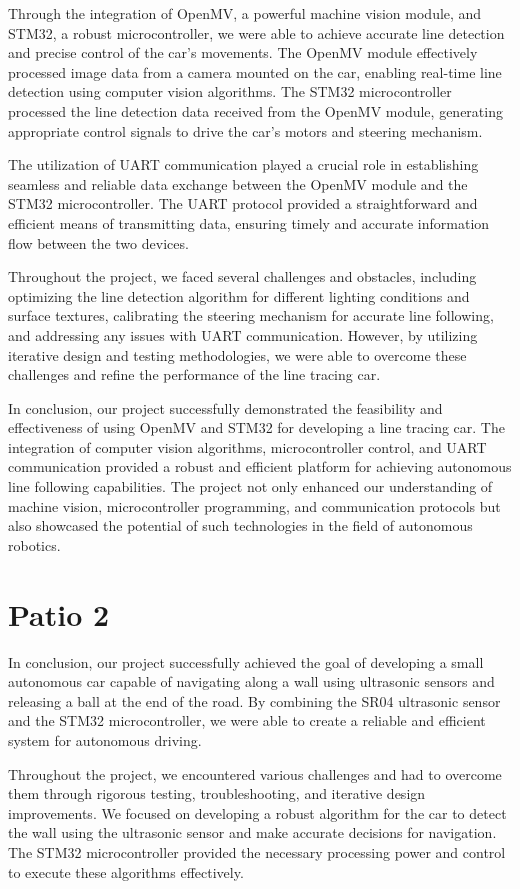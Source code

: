 \documentclass[12pt, a4paper, oneside]{report}
\begin{document}
Through the integration of OpenMV, a powerful machine vision module, and STM32, a robust microcontroller, we were able to achieve accurate line detection and precise control of the car's movements. The OpenMV module effectively processed image data from a camera mounted on the car, enabling real-time line detection using computer vision algorithms. The STM32 microcontroller processed the line detection data received from the OpenMV module, generating appropriate control signals to drive the car's motors and steering mechanism.

The utilization of UART communication played a crucial role in establishing seamless and reliable data exchange between the OpenMV module and the STM32 microcontroller. The UART protocol provided a straightforward and efficient means of transmitting data, ensuring timely and accurate information flow between the two devices.

Throughout the project, we faced several challenges and obstacles, including optimizing the line detection algorithm for different lighting conditions and surface textures, calibrating the steering mechanism for accurate line following, and addressing any issues with UART communication. However, by utilizing iterative design and testing methodologies, we were able to overcome these challenges and refine the performance of the line tracing car.

In conclusion, our project successfully demonstrated the feasibility and effectiveness of using OpenMV and STM32 for developing a line tracing car. The integration of computer vision algorithms, microcontroller control, and UART communication provided a robust and efficient platform for achieving autonomous line following capabilities. The project not only enhanced our understanding of machine vision, microcontroller programming, and communication protocols but also showcased the potential of such technologies in the field of autonomous robotics.

\section{Patio 2}
In conclusion, our project successfully achieved the goal of developing a small autonomous car capable of navigating along a wall using ultrasonic sensors and releasing a ball at the end of the road. By combining the SR04 ultrasonic sensor and the STM32 microcontroller, we were able to create a reliable and efficient system for autonomous driving.

Throughout the project, we encountered various challenges and had to overcome them through rigorous testing, troubleshooting, and iterative design improvements. We focused on developing a robust algorithm for the car to detect the wall using the ultrasonic sensor and make accurate decisions for navigation. The STM32 microcontroller provided the necessary processing power and control to execute these algorithms effectively.
\end{document}
